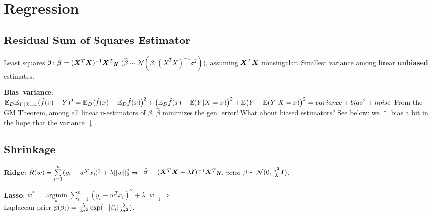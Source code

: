 \section{Regression}

\subsection*{Residual Sum of Squares Estimator}
Least squares $\boldsymbol{\beta}$:
$\hat{\boldsymbol{\beta}} = (\boldsymbol{X}^T\boldsymbol{X})^{-1}\boldsymbol{X}^T \boldsymbol{y}$ ($\hat{\beta} \sim \mathcal{N}(\beta,(X^TX)^{-1}\sigma^2)$),
assuming $\boldsymbol{X}^T\boldsymbol{X}$ nonsingular.
Smallest variance among linear \textbf{unbiased} estimates.

\textbf{Bias--variance}:
$\mathbb E_D \mathbb E_{Y | X=x}(\hat{f}(x) - Y)^2
=
\mathbb E_D \big(\hat{f}(x) - \mathbb E_D \hat{f}(x) \big)^2
+ \big( \mathbb E_D \hat{f}(x) - \mathbb E(Y | X=x) \big)^2
+ \mathbb E \big(Y - \mathbb E(Y | X=x) \big)^2
=
variance + bias^2 + noise
$
From the GM Theorem, among all linear u-estimators of $\beta$, $\hat \beta$ minimizes the gen. error! What about biased estimators? See below: we $\uparrow$ bias a bit in the hope that the variance $\downarrow$.


\subsection*{Shrinkage}
\textbf{Ridge}:
$\hat{R}(w) = \sum \limits_{i=1}^n (y_i - w^Tx_i)^2 + \lambda ||w||_2^2 \Rightarrow\\$
$\hat{\boldsymbol{\beta}} = (\boldsymbol{X}^T\boldsymbol{X} + \lambda \boldsymbol{I})^{-1}\boldsymbol{X}^T \boldsymbol{y}$,
prior $\beta \sim \mathcal{N}(0, \frac{\sigma^2}{\lambda} \boldsymbol{I})$.

\textbf{Lasso}:
$w^* = \underset{w}{\operatorname{argmin}} \sum \limits_{i=1}^n (y_i - w^Tx_i)^2 + \lambda ||w||_1 \Rightarrow$\\
Laplacean prior $p(\beta_i) = \frac{\lambda}{4\sigma^2} \exp(-\lvert\beta_i\rvert \frac{\lambda}{2\sigma^2})$.

